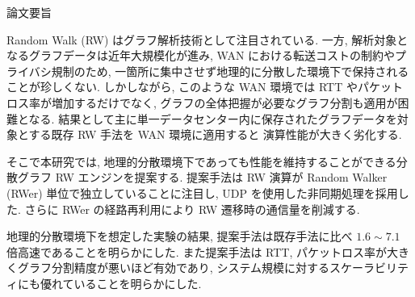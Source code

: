 \begin{center}
\Huge{論文要旨}
\end{center}




Random Walk (RW) はグラフ解析技術として注目されている. 
一方, 解析対象となるグラフデータは近年大規模化が進み, WAN における転送コストの制約やプライバシ規制のため, 
一箇所に集中させず地理的に分散した環境下で保持されることが珍しくない. 
しかしながら, このような WAN 環境では RTT やパケットロス率が増加するだけでなく, 
グラフの全体把握が必要なグラフ分割も適用が困難となる. 
結果として主に単一データセンター内に保存されたグラフデータを対象とする既存 RW 手法を WAN 環境に適用すると
演算性能が大きく劣化する. 

そこで本研究では, 地理的分散環境下であっても性能を維持することができる分散グラフ RW エンジンを提案する. 
提案手法は RW 演算が Random Walker (RWer) 単位で独立していることに注目し, UDP を使用した非同期処理を採用した. 
さらに RWer の経路再利用により RW 遷移時の通信量を削減する. 

地理的分散環境下を想定した実験の結果, 提案手法は既存手法に比べ $1.6 \sim 7.1$ 倍高速であることを明らかにした. 
また提案手法は RTT, パケットロス率が大きくグラフ分割精度が悪いほど有効であり, 
システム規模に対するスケーラビリティにも優れていることを明らかにした. 

\vspace{36pt}
\thispagestyle{empty}
\clearpage